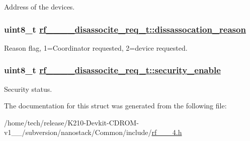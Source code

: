 Address of the devices. \hypertarget{structrf__802__15__4__disassocite__req__t_310f7da6cba70895a4b81fcb17d95e19}{
\subsubsection[dissassocation\_\-reason]{\setlength{\rightskip}{0pt plus 5cm}uint8\_\-t \hyperlink{structrf__802__15__4__disassocite__req__t_310f7da6cba70895a4b81fcb17d95e19}{rf\_\_\_\_\-disassocite\_\-req\_\-t::dissassocation\_\-reason}}}
\label{structrf__802__15__4__disassocite__req__t_310f7da6cba70895a4b81fcb17d95e19}


Reason flag, 1=Coordinator requested, 2=device requested. \hypertarget{structrf__802__15__4__disassocite__req__t_4f897e2cb21faf5dc3fdf4a6853cc57c}{
\subsubsection[security\_\-enable]{\setlength{\rightskip}{0pt plus 5cm}uint8\_\-t \hyperlink{structrf__802__15__4__disassocite__req__t_4f897e2cb21faf5dc3fdf4a6853cc57c}{rf\_\_\_\_\-disassocite\_\-req\_\-t::security\_\-enable}}}
\label{structrf__802__15__4__disassocite__req__t_4f897e2cb21faf5dc3fdf4a6853cc57c}


Security status. 

The documentation for this struct was generated from the following file:\begin{CompactItemize}
\item 
/home/tech/release/K210-Devkit-CDROM-v1\_\_/subversion/nanostack/Common/include/\hyperlink{rf__802__15__4_8h}{rf\_\_\_\-4.h}\end{CompactItemize}
